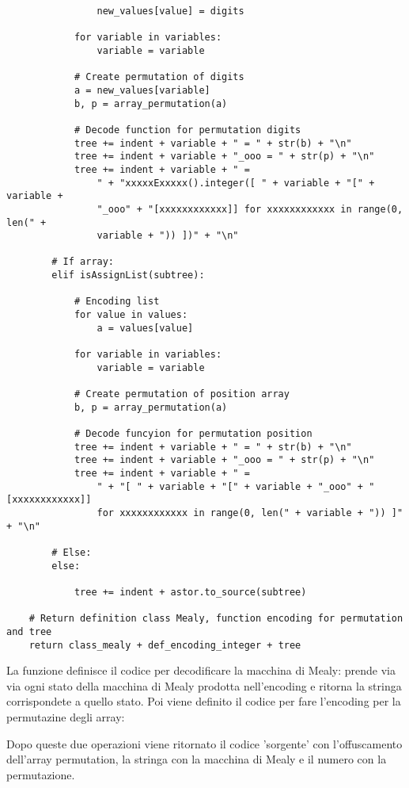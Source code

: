 \documentclass[a4paper,oneside,openright,titlepage,10pt,footinclude,headinclude]{scrbook}
\begin{document}
\begin{graybox}[innerleftmargin=2,]
\begin{lstlisting}
                new_values[value] = digits

            for variable in variables:
                variable = variable

            # Create permutation of digits
            a = new_values[variable]
            b, p = array_permutation(a)

            # Decode function for permutation digits
            tree += indent + variable + " = " + str(b) + "\n"
            tree += indent + variable + "_ooo = " + str(p) + "\n"
            tree += indent + variable + " = 
                " + "xxxxxExxxxx().integer([ " + variable + "[" + variable + 
                "_ooo" + "[xxxxxxxxxxxx]] for xxxxxxxxxxxx in range(0, len(" + 
                variable + ")) ])" + "\n"

        # If array:
        elif isAssignList(subtree):

            # Encoding list
            for value in values:
                a = values[value]

            for variable in variables:
                variable = variable

            # Create permutation of position array
            b, p = array_permutation(a)

            # Decode funcyion for permutation position
            tree += indent + variable + " = " + str(b) + "\n"
            tree += indent + variable + "_ooo = " + str(p) + "\n"
            tree += indent + variable + " = 
                " + "[ " + variable + "[" + variable + "_ooo" + "[xxxxxxxxxxxx]] 
                for xxxxxxxxxxxx in range(0, len(" + variable + ")) ]" + "\n"

        # Else:
        else:

            tree += indent + astor.to_source(subtree)

    # Return definition class Mealy, function encoding for permutation and tree
    return class_mealy + def_encoding_integer + tree
\end{lstlisting}
\end{graybox}

La funzione definisce il codice per decodificare la macchina di Mealy: prende via via ogni stato della macchina di Mealy prodotta nell'encoding e ritorna la stringa corrispondete a quello stato. %
Poi viene definito il codice per fare l'encoding per la permutazine degli array: %

Dopo queste due operazioni viene ritornato il codice 'sorgente' con l'offuscamento dell'array permutation, la stringa con la macchina di Mealy e il numero con la permutazione.
\end{document}
